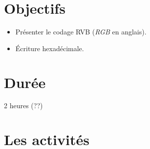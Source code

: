 \documentclass[class=report,crop=false, 12pt]{standalone}
\begin{document}



\section*{Objectifs}

\begin{itemize}
  \item Présenter le codage RVB (\emph{RGB} en anglais).
  \item \'Ecriture hexadécimale.
\end{itemize}


\section*{Durée}

2 heures (??)

\section*{Les activités}
\end{document}
